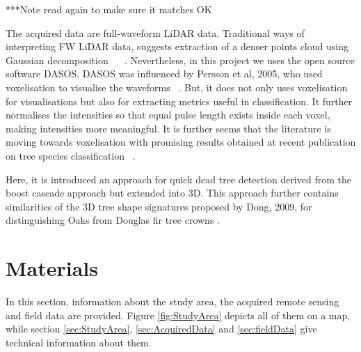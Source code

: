 \documentclass{subfiles}
\begin{document}
{\color{red} ***Note read again to make sure it matches OK}
\par The acquired data are full-waveform LiDAR data. Traditional ways of interpreting FW LiDAR data, suggests extraction of a denser points cloud using Gaussian decomposition ~\cite{Neuenschwander2009} ~\cite{Reitberger2008}. Nevertheless, in this project we uses the open source software DASOS. DASOS was influenced by Persson et al, 2005, who used voxelisation to visualise the waveforms ~\cite{Persson2005}. But, it does not only uses voxelisation for visualisations but also for extracting metrics useful in classification. It further normalises the intensities so that equal pulse length exists inside each voxel, making intensities more meaningful. It is further seems that the literature is moving towards voxelisation with promising results obtained at recent publication on tree species classification ~\cite{Cao2016}. 

Here, it is introduced an approach for quick dead tree detection derived from the boost cascade approach \cite{Viola2001} but extended into 3D. This approach further contains similarities of the 3D tree shape signatures proposed by Dong, 2009, for distinguishing Oaks from Douglas fir tree crowns \cite{Dong2009}. 







	
	
	


\section{Materials}
In this section, information about the study area, the acquired remote sensing and field data are provided. Figure \ref{fig:StudyArea} depicts all of them on a map, while section \ref{sec:StudyArea}, \ref{sec:AcquiredData} and \ref{sec:fieldData} give technical information about them. 
\end{document}
